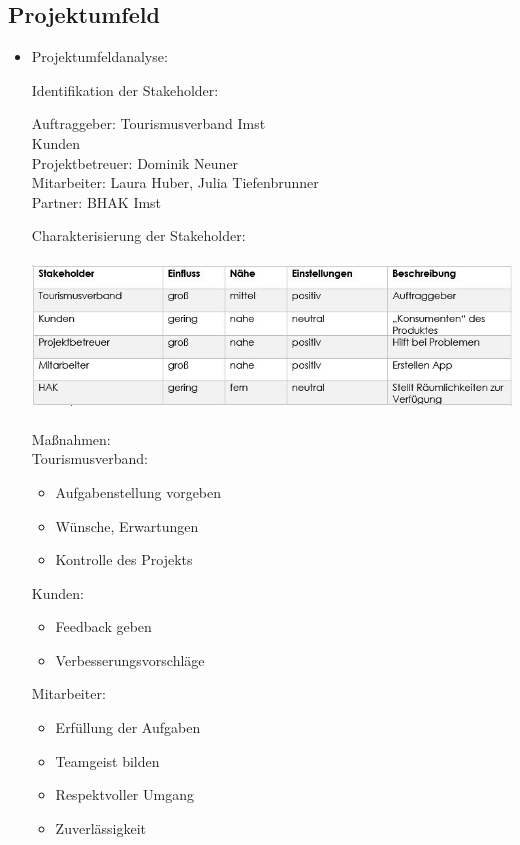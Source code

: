 \subsection{Projektumfeld}
\begin{itemize}
	
	\item Projektumfeldanalyse:
	
	Identifikation der Stakeholder:
	
	Auftraggeber: Tourismusverband Imst\\	
	Kunden\\	
	Projektbetreuer: Dominik Neuner	\\
	Mitarbeiter: Laura Huber, Julia Tiefenbrunner\\	
	Partner: BHAK Imst
	
	Charakterisierung der Stakeholder:
	
	\includegraphics[height=4cm]{Stakeholder}
	
	Maßnahmen:\\
	Tourismusverband:
	\begin{itemize}
			\item Aufgabenstellung vorgeben
			\item Wünsche, Erwartungen
			\item Kontrolle des Projekts\\
	\end{itemize}
	
	Kunden:
	\begin{itemize}
	\item Feedback geben
	\item Verbesserungsvorschläge\\
	\end{itemize}
	
	Mitarbeiter:
	\begin{itemize}
		\item Erfüllung der Aufgaben
		\item Teamgeist bilden
		\item Respektvoller Umgang
		\item Zuverlässigkeit\\
	\end{itemize}
	

\end{itemize}
